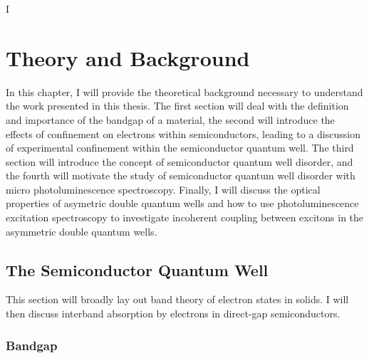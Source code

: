 I\chapter{Theory and Background}
In this chapter, I will provide the theoretical background necessary to understand the work presented in this thesis. The first section will deal with the definition and importance of the bandgap of a material, the second will introduce the effects of confinement on electrons within semiconductors, leading to a discussion of experimental confinement within the semiconductor quantum well. The third section will introduce the concept of semiconductor quantum well disorder, and the fourth will motivate the study of semiconductor quantum well disorder with micro photoluminescence spectroscopy. Finally, I will discuss the optical properties of asymetric double quantum wells and how to use photoluminescence excitation spectroscopy to investigate incoherent coupling between excitons in the asymmetric double quantum wells.

\section{The Semiconductor Quantum Well}
This section will broadly lay out band theory of electron states in solids. I will then discuss interband absorption by electrons in direct-gap semiconductors. 
\subsection{Bandgap}

